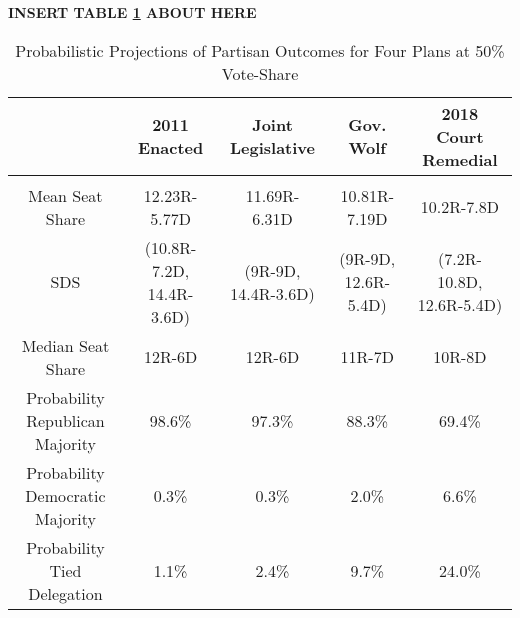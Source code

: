 


 \begin{center}\textbf{INSERT TABLE \ref{tab:prob} ABOUT HERE} \end{center}


\begin{landscape}
\begin{table}[!htbp] \centering 
  \caption{Probabilistic Projections of Partisan Outcomes for Four Plans at 50\% Vote-Share} 
  \label{tab:prob} 
\begin{tabular}{@{\extracolsep{-5pt}} ccccc} 
 & 2011 Enacted & Joint Legislative & Gov. Wolf & 2018 Court Remedial \\ 
\hline \\[-1.8ex] 
Mean Seat Share & 12.23R-5.77D & 11.69R-6.31D & 10.81R-7.19D & 10.2R-7.8D \\ 
SDS & (10.8R-7.2D, 14.4R-3.6D) & (9R-9D, 14.4R-3.6D) & (9R-9D, 12.6R-5.4D) & (7.2R-10.8D, 12.6R-5.4D) \\ 
Median Seat Share & 12R-6D & 12R-6D & 11R-7D & 10R-8D \\ 
Probability Republican Majority & 98.6\% & 97.3\% & 88.3\% & 69.4\% \\ 
Probability Democratic Majority & 0.3\% & 0.3\% & 2.0\% & 6.6\% \\ 
Probability Tied Delegation & 1.1\% & 2.4\% & 9.7\% & 24.0\% \\ 
\end{tabular}
\end{table}
\end{landscape}
 
 
